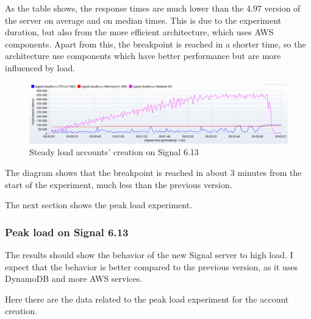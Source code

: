 As the table shows, the response times are much lower than the 4.97 version of the server on average and on median times. This is due to the experiment duration, but also from the more efficient architecture, which uses AWS components.
Apart from this, the breakpoint is reached in a shorter time, so the architecture use components which have better performance but are more influenced by load.

\begin{figure}[H]
    \centering
    \includegraphics[width=\textwidth]{images/613/6.13-steady-create}
    \caption{Steady load accounts' creation on Signal 6.13}
    \label{fig:signalbasecreateloadnew}
\end{figure}

The diagram shows that the breakpoint is reached in about $3$ minutes from the start of the experiment, much less than the previous version.

The next section shows the peak load experiment.

\subsubsection{Peak load on Signal 6.13}

The results should show the behavior of the new Signal server to high load. I expect that the behavior is better compared to the previous version, as it uses DynamoDB and more AWS services.

Here there are the data related to the peak load experiment for the account creation.

